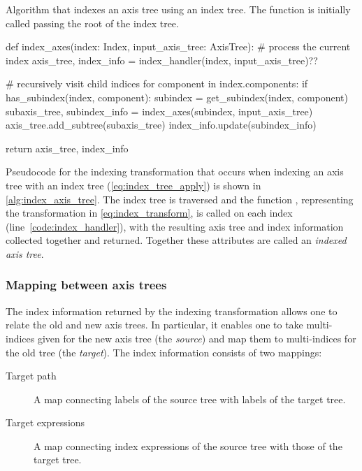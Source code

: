 \documentclass[thesis]{subfiles}
\begin{document}
\begin{algorithm}
  \caption{
    Algorithm that indexes an axis tree using an index tree.
    The function is initially called passing the root of the index tree.
  }

  \begin{flushright}
    \begin{minipage}{.96\textwidth}
  \begin{pyalg2}
    def index_axes(index: Index, input_axis_tree: AxisTree):
      # process the current index
      axis_tree, index_info = index_handler(index, input_axis_tree)?\label{code:index_handler}?

      # recursively visit child indices
      for component in index.components:
        if has_subindex(index, component):
          subindex = get_subindex(index, component)
          subaxis_tree, subindex_info = index_axes(subindex,
                                                   input_axis_tree)
          axis_tree.add_subtree(subaxis_tree)
          index_info.update(subindex_info)

      return axis_tree, index_info
  \end{pyalg2}
    \end{minipage}
  \end{flushright}

  \label{alg:index_axis_tree}
\end{algorithm}

Pseudocode for the indexing transformation that occurs when indexing an axis tree with an index tree (\cref{eq:index_tree_apply}) is shown in \cref{alg:index_axis_tree}.
The index tree is traversed and the function , representing the transformation in \cref{eq:index_transform}, is called on each index (line~\ref{code:index_handler}), with the resulting axis tree and index information collected together and returned.
Together these attributes are called an \emph{indexed axis tree}.

\subsubsection{Mapping between axis trees}

The index information returned by the indexing transformation allows one to relate the old and new axis trees.
In particular, it enables one to take multi-indices given for the new axis tree (the \emph{source}) and map them to multi-indices for the old tree (the \emph{target}).
The index information consists of two mappings:
\begin{description}
  \item[Target path] A map connecting labels of the source tree with labels of the target tree.
  \item[Target expressions] A map connecting index expressions of the source tree with those of the target tree.
\end{description}
\end{document}
